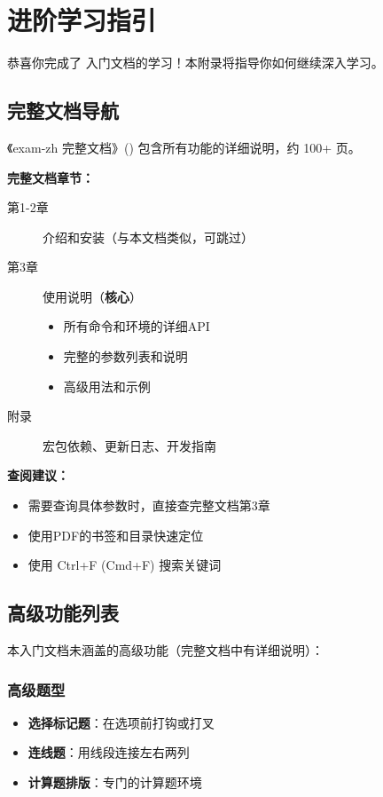 
\section{进阶学习指引}

恭喜你完成了  入门文档的学习！本附录将指导你如何继续深入学习。

\subsection{完整文档导航}

《exam-zh 完整文档》() 包含所有功能的详细说明，约 100+ 页。

\textbf{完整文档章节：}

\begin{description}
  \item[第1-2章] 介绍和安装（与本文档类似，可跳过）
  \item[第3章] 使用说明（\textbf{核心}）
    \begin{itemize}
      \item 所有命令和环境的详细API
      \item 完整的参数列表和说明
      \item 高级用法和示例
    \end{itemize}
  \item[附录] 宏包依赖、更新日志、开发指南
\end{description}

\textbf{查阅建议：}
\begin{itemize}
  \item 需要查询具体参数时，直接查完整文档第3章
  \item 使用PDF的书签和目录快速定位
  \item 使用 Ctrl+F (Cmd+F) 搜索关键词
\end{itemize}


\subsection{高级功能列表}

本入门文档未涵盖的高级功能（完整文档中有详细说明）：

\subsubsection{高级题型}

\begin{itemize}
  \item \textbf{选择标记题}：在选项前打钩或打叉
  \item \textbf{连线题}：用线段连接左右两列
  \item \textbf{计算题排版}：专门的计算题环境
\end{itemize}

